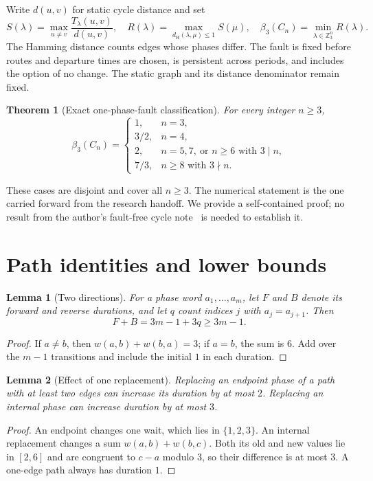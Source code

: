 \documentclass[11pt,a4paper]{article}
\newtheorem{theorem}{Theorem}
\newtheorem{lemma}{Lemma}
\newcommand{\Z}{\mathbb Z}
\newcommand{\Ham}{d_{\mathrm H}}
\newcommand{\Str}{S}
\begin{document}
Write $d(u,v)$ for static cycle distance and set
\begin{equation}
 \Str(\lambda)=\max_{u\ne v}\frac{T_\lambda(u,v)}{d(u,v)},\quad
 R(\lambda)=\max_{\Ham(\lambda,\mu)\le1}\Str(\mu),\quad
 \beta_3(C_n)=\min_{\lambda\in\Z_3^n}R(\lambda).
 \label{eq:objective}
\end{equation}
The Hamming distance counts edges whose phases differ. The fault is fixed before routes and departure times are chosen, is persistent across periods, and includes the option of no change. The static graph and its distance denominator remain fixed.

\begin{theorem}[Exact one-phase-fault classification]\label{thm:main}
For every integer $n\ge3$,
\[
\boxed{\displaystyle
\beta_3(C_n)=\begin{cases}
 1,&n=3,\\
 3/2,&n=4,\\
 2,&n=5,7,\ \text{or }n\ge6\text{ with }3\mid n,\\
 7/3,&n\ge8\text{ with }3\nmid n.
\end{cases}}
\]
\end{theorem}
These cases are disjoint and cover all $n\ge3$. The numerical statement is the one carried forward from the research handoff. We provide a self-contained proof; no result from the author's fault-free cycle note~\cite{yonezu27} is needed to establish it.

\section{Path identities and lower bounds}
\begin{lemma}[Two directions]\label{lem:sum}
For a phase word $a_1,\ldots,a_m$, let $F$ and $B$ denote its forward and reverse durations, and let $q$ count indices $j$ with $a_j=a_{j+1}$. Then
\begin{equation}
 F+B=3m-1+3q\ge3m-1.\label{eq:sum}
\end{equation}
\end{lemma}
\begin{proof}
If $a\ne b$, then $w(a,b)+w(b,a)=3$; if $a=b$, the sum is $6$. Add over the $m-1$ transitions and include the initial $1$ in each duration.
\end{proof}

\begin{lemma}[Effect of one replacement]\label{lem:perturb}
Replacing an endpoint phase of a path with at least two edges can increase its duration by at most $2$. Replacing an internal phase can increase duration by at most $3$.
\end{lemma}
\begin{proof}
An endpoint changes one wait, which lies in $\{1,2,3\}$. An internal replacement changes a sum $w(a,b)+w(b,c)$. Both its old and new values lie in $[2,6]$ and are congruent to $c-a$ modulo $3$, so their difference is at most $3$. A one-edge path always has duration $1$.
\end{proof}
\end{document}
